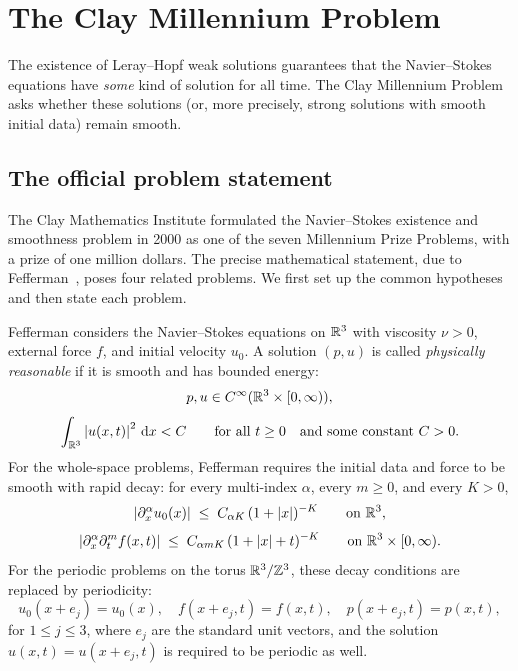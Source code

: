 \section{The Clay Millennium Problem}\label{sec:clay}

The existence of Leray--Hopf weak solutions guarantees that the Navier--Stokes equations
have \emph{some} kind of solution for all time.  The Clay Millennium Problem asks whether
these solutions (or, more precisely, strong solutions with smooth initial data) remain
smooth.

\subsection{The official problem statement}

The Clay Mathematics Institute formulated the Navier--Stokes existence and smoothness
problem in 2000 as one of the seven Millennium Prize Problems, with a prize of one
million dollars.  The precise mathematical statement, due to
Fefferman~\cite{fefferman2006}, poses four related problems.  We first set up the
common hypotheses and then state each problem.

Fefferman considers the Navier--Stokes equations on $\mathbb{R}^{3}$ with viscosity $\nu > 0$,
external force $f$, and initial velocity $u_{0}$.  A solution $(p, u)$ is called
\emph{physically reasonable} if it is smooth and has bounded energy:
\begin{equation}\label{eq:clay-smooth}
  p, u \in C^{\infty}(\mathbb{R}^{3} \times [0, \infty)),
\end{equation}
\begin{equation}\label{eq:clay-finite-energy}
  \int_{\mathbb{R}^{3}} \left\lvert u(x, t) \right\rvert^{2} \,\mathrm{d} x < C
  \qquad \text{for all } t \ge 0
  \quad \text{and some constant } C > 0.
\end{equation}
For the whole-space problems, Fefferman requires the initial data and force to be smooth
with rapid decay: for every multi-index $\alpha$, every $m \ge 0$, and every $K > 0$,
\begin{equation}\label{eq:clay-decay}
  \left\lvert \partial^{\alpha}_{x} u_{0}(x) \right\rvert
  \;\le\;
  C_{\alpha K}\,(1 + \left\lvert x \right\rvert)^{-K}
  \qquad \text{on } \mathbb{R}^{3},
\end{equation}
\begin{equation}\label{eq:clay-force-decay}
  \left\lvert \partial^{\alpha}_{x} \partial^{m}_{t} f(x,t) \right\rvert
  \;\le\;
  C_{\alpha m K}\,(1 + \left\lvert x \right\rvert + t)^{-K}
  \qquad \text{on } \mathbb{R}^{3} \times [0, \infty).
\end{equation}
For the periodic problems on the torus $\mathbb{R}^{3}/\mathbb{Z}^{3}$, these decay conditions are
replaced by periodicity:
\begin{equation}\label{eq:clay-periodic}
  u_{0}(x + e_{j}) = u_{0}(x), \quad
  f(x + e_{j}, t) = f(x, t), \quad
  p(x + e_{j}, t) = p(x, t),
\end{equation}
for $1 \le j \le 3$, where $e_{j}$ are the standard unit vectors, and the solution
$u(x,t) = u(x + e_{j}, t)$ is required to be periodic as well.

